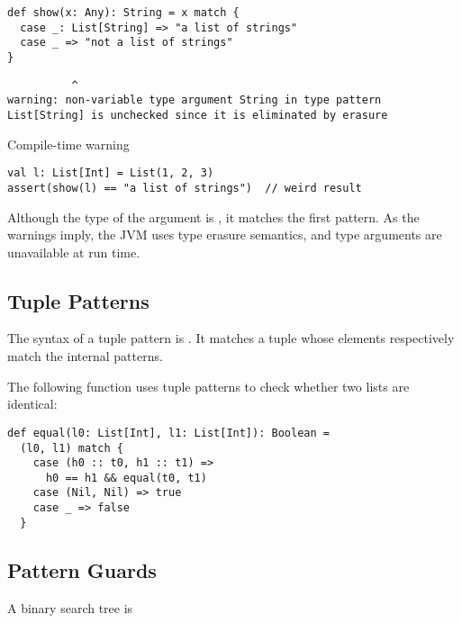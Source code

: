 \begin{verbatim}
def show(x: Any): String = x match {
  case _: List[String] => "a list of strings"
  case _ => "not a list of strings"
}
\end{verbatim}
\vspace{-1em}
\begin{mdframed}[hidealllines=true,backgroundcolor=gray!10,innerleftmargin=3pt,innerrightmargin=3pt,leftmargin=-3pt,rightmargin=-3pt]
\begin{verbatim}
          ^
warning: non-variable type argument String in type pattern
List[String] is unchecked since it is eliminated by erasure
\end{verbatim}
\vspace{-1.5em}
\begin{flushright}
\scriptsize\textsf{Compile-time warning}
\end{flushright}
\end{mdframed}

\begin{verbatim}
val l: List[Int] = List(1, 2, 3)
assert(show(l) == "a list of strings")  // weird result
\end{verbatim}

Although the type of the argument is , it matches the first
pattern. As the warnings imply, the JVM uses type erasure
semantics, and type arguments are unavailable at run time.

\subsection{Tuple Patterns}

The syntax of a tuple pattern is .
It matches a tuple whose elements respectively match the internal patterns.

The following function uses tuple patterns to check
whether two lists are identical:

\begin{verbatim}
def equal(l0: List[Int], l1: List[Int]): Boolean =
  (l0, l1) match {
    case (h0 :: t0, h1 :: t1) =>
      h0 == h1 && equal(t0, t1)
    case (Nil, Nil) => true
    case _ => false
  }
\end{verbatim}

\subsection{Pattern Guards}

A binary search tree is


